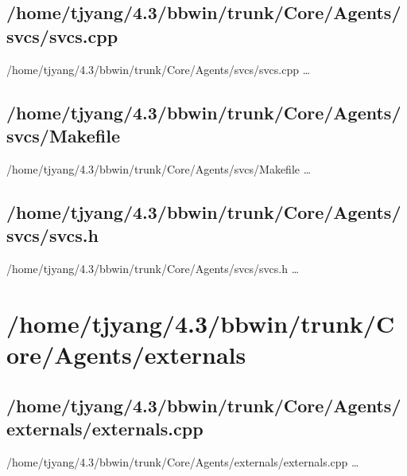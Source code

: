 \subsection{/home/tjyang/4.3/bbwin/trunk/Core/Agents/svcs/svcs.cpp}
\lstset{numberstyle=\tiny,numbers=left,
   breaklines=true,
   stepnumber=1,numbersep=5pt,firstnumber=1,
   xleftmargin=12pt,showstringspaces=false}
\noindent /home/tjyang/4.3/bbwin/trunk/Core/Agents/svcs/svcs.cpp  \ldots



\subsection{/home/tjyang/4.3/bbwin/trunk/Core/Agents/svcs/Makefile}
\lstset{numberstyle=\tiny,numbers=left,
   breaklines=true,
   stepnumber=1,numbersep=5pt,firstnumber=1,
   xleftmargin=12pt,showstringspaces=false}
\noindent /home/tjyang/4.3/bbwin/trunk/Core/Agents/svcs/Makefile  \ldots





\subsection{/home/tjyang/4.3/bbwin/trunk/Core/Agents/svcs/svcs.h}
\lstset{numberstyle=\tiny,numbers=left,
   breaklines=true,
   stepnumber=1,numbersep=5pt,firstnumber=1,
   xleftmargin=12pt,showstringspaces=false}
\noindent /home/tjyang/4.3/bbwin/trunk/Core/Agents/svcs/svcs.h  \ldots



\section{/home/tjyang/4.3/bbwin/trunk/Core/Agents/externals}


\subsection{/home/tjyang/4.3/bbwin/trunk/Core/Agents/externals/externals.cpp}
\lstset{numberstyle=\tiny,numbers=left,
   breaklines=true,
   stepnumber=1,numbersep=5pt,firstnumber=1,
   xleftmargin=12pt,showstringspaces=false}
\noindent /home/tjyang/4.3/bbwin/trunk/Core/Agents/externals/externals.cpp  \ldots




